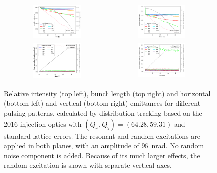 \documentclass[%
 reprint,
 amsmath,amssymb,
 aps,
prstab,
longbibliography
]{revtex4-1}
\begin{document}
\begin{figure}
\begin{tabular}{cc}
\includegraphics[width=0.49\textwidth]{2016injerra2b2u_pattern_3_5um_intensity.png}
  &
\includegraphics[width=0.49\textwidth]{2016injerra2b2u_pattern_3_5um_sigm.png}
  \\
\includegraphics[width=0.49\textwidth]{2016injerra2b2u_pattern_3_5um_emit1.png} &
\includegraphics[width=0.49\textwidth]{2016injerra2b2u_pattern_3_5um_emit2.png}
  \\
\end{tabular}
\caption{Relative intensity (top left), bunch length (top right) and
  horizontal (bottom left) and vertical (bottom right) emittances for
  different pulsing patterns, calculated by distribution tracking
  based on the 2016 injection optics with
  $(Q_x, Q_y) = (64.28, 59.31)$ and standard lattice errors. The
  resonant and random excitations are applied in both planes, with an
  amplitude of 96~nrad. No random noise component is added. Because of
  its much larger effects, the random excitation is shown with
  separate vertical axes.}
\label{fig:patternsim}
\end{figure}
\end{document}
